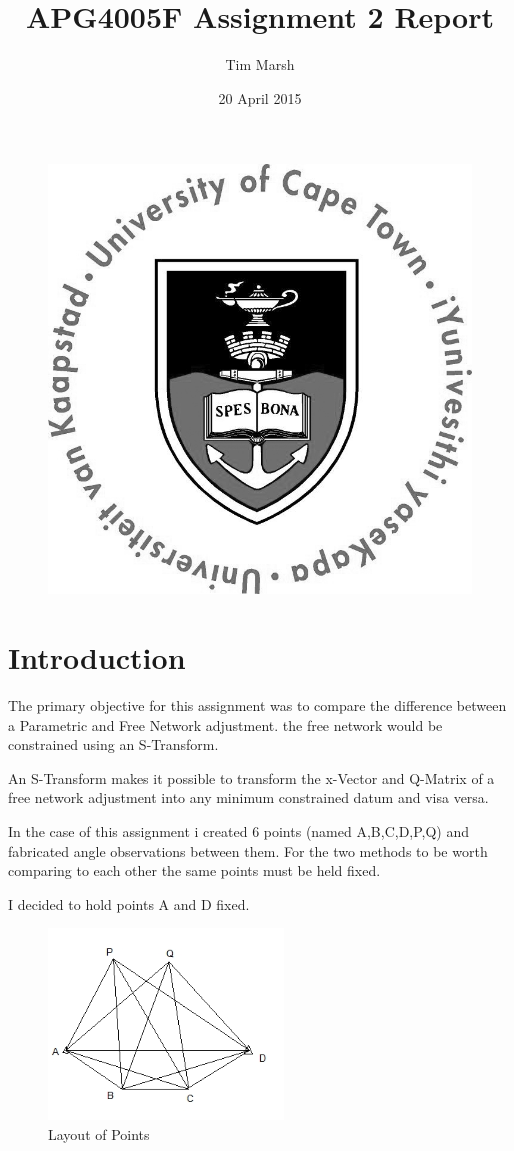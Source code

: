 \documentclass[11pt,a4paper]{article}
\title{APG4005F Assignment 2 Report}
\date{20 April 2015}
\author{Tim Marsh}
\begin{document}
	
	\maketitle
	\begin{figure}[H]
	\centering
	\includegraphics[width=0.7\linewidth]{./UCTcircular_logo1_CMYK}
	\label{fig:UCTcircular_logo1_CMYK}
	\end{figure}
	
	\newpage
	
	\tableofcontents
	
	\newpage
	
	
	\section{Introduction}
	
	The primary objective for this assignment was to compare the difference between a Parametric and Free Network adjustment. the free network would be constrained using an S-Transform.
	
	An S-Transform makes it possible to transform the x-Vector and Q-Matrix of a free network adjustment into any minimum constrained datum and visa versa.
	
	In the case of this assignment i created 6 points (named A,B,C,D,P,Q) and fabricated angle observations between them. For the two methods to be worth comparing to each other the same points must be held fixed.
	
	I decided to hold points A and D fixed.

	\begin{figure}[H]
	\centering
	\includegraphics[width=0.5\linewidth]{./unnamed}
	\caption{Layout of Points}
	\label{fig:LayoutofPoints}
	\end{figure}
\end{document}
